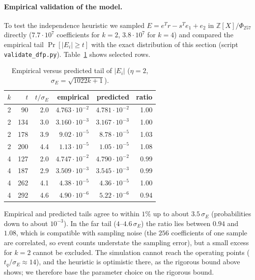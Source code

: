 \documentclass[11pt]{article}
\theoremstyle{remark}
\newcommand{\Z}{\mathbb{Z}}
\begin{document}
\paragraph{Empirical validation of the model.} To test the independence heuristic we sampled $E=e^{T}r-s^{T}e_1+e_2$ in $\Z[X]/\Phi_{257}$ directly ($7.7\cdot10^{7}$ coefficients for $k=2$, $3.8\cdot10^{7}$ for $k=4$) and compared the empirical tail $\Pr[|E_i|\ge t]$ with the exact distribution of this section (script \texttt{validate\_dfp.py}). Table~\ref{tab:mc} shows selected rows.
\begin{table}[h]\centering\small
\begin{tabular}{rrrrrr}\toprule
$k$ & $t$ & $t/\sigma_E$ & empirical & predicted & ratio\\\midrule
2 & 90 & 2.0 & $4.763\cdot10^{-2}$ & $4.781\cdot10^{-2}$ & 1.00\\
2 & 134 & 3.0 & $3.160\cdot10^{-3}$ & $3.167\cdot10^{-3}$ & 1.00\\
2 & 178 & 3.9 & $9.02\cdot10^{-5}$ & $8.78\cdot10^{-5}$ & 1.03\\
2 & 200 & 4.4 & $1.13\cdot10^{-5}$ & $1.05\cdot10^{-5}$ & 1.08\\\midrule
4 & 127 & 2.0 & $4.747\cdot10^{-2}$ & $4.790\cdot10^{-2}$ & 0.99\\
4 & 187 & 2.9 & $3.509\cdot10^{-3}$ & $3.545\cdot10^{-3}$ & 0.99\\
4 & 262 & 4.1 & $4.38\cdot10^{-5}$ & $4.36\cdot10^{-5}$ & 1.00\\
4 & 292 & 4.6 & $4.90\cdot10^{-6}$ & $5.22\cdot10^{-6}$ & 0.94\\\bottomrule
\end{tabular}
\caption{Empirical versus predicted tail of $|E_i|$ ($\eta=2$, $\sigma_E=\sqrt{1022k+1}$).}\label{tab:mc}
\end{table}
Empirical and predicted tails agree to within $1\%$ up to about $3.5\,\sigma_E$ (probabilities down to about $10^{-3}$). In the far tail ($4$--$4.6\,\sigma_E$) the ratio lies between $0.94$ and $1.08$, which is compatible with sampling noise (the $256$ coefficients of one sample are correlated, so event counts understate the sampling error), but a small excess for $k=2$ cannot be excluded. The simulation cannot reach the operating points ($t_q/\sigma_E\approx14$), and the heuristic is optimistic there, as the rigorous bound above shows; we therefore base the parameter choice on the rigorous bound.
\end{document}
